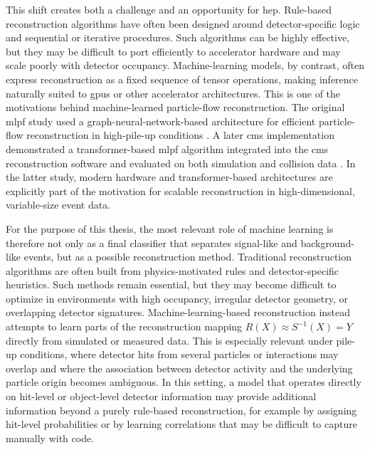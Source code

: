 This shift creates both a challenge and an opportunity for \gls{hep}. Rule-based reconstruction algorithms have often been designed around detector-specific logic and sequential or iterative procedures. Such algorithms can be highly effective, but they may be difficult to port efficiently to accelerator hardware and may scale poorly with detector occupancy. Machine-learning models, by contrast, often express reconstruction as a fixed sequence of tensor operations, making inference naturally suited to \glspl{gpu} or other accelerator architectures. This is one of the motivations behind machine-learned particle-flow reconstruction. The original \gls{mlpf} study used a graph-neural-network-based architecture for efficient particle-flow reconstruction in high-pile-up conditions \cite{pata2021-mlpf}. A later \gls{cms} implementation demonstrated a transformer-based \gls{mlpf} algorithm integrated into the \gls{cms} reconstruction software and evaluated on both simulation and collision data \cite{pata2026-mlpf}. In the latter study, modern hardware and transformer-based architectures are explicitly part of the motivation for scalable reconstruction in high-dimensional, variable-size event data.

For the purpose of this thesis, the most relevant role of machine learning is therefore not only as a final classifier that separates signal-like and background-like events, but as a possible reconstruction method. Traditional reconstruction algorithms are often built from physics-motivated rules and detector-specific heuristics. Such methods remain essential, but they may become difficult to optimize in environments with high occupancy, irregular detector geometry, or overlapping detector signatures. Machine-learning-based reconstruction instead attempts to learn parts of the reconstruction mapping $R(X) \approx S^{-1}(X) = Y$ directly from simulated or measured data. This is especially relevant under pile-up conditions, where detector hits from several particles or interactions may overlap and where the association between detector activity and the underlying particle origin becomes ambiguous. In this setting, a model that operates directly on hit-level or object-level detector information may provide additional information beyond a purely rule-based reconstruction, for example by assigning hit-level probabilities or by learning correlations that may be difficult to capture manually with code. 

